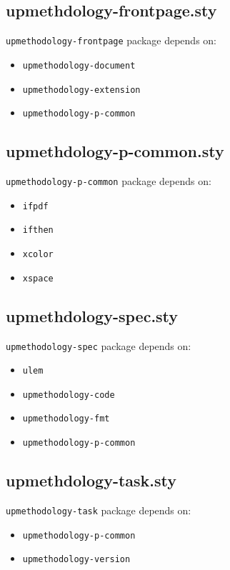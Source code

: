 \documentclass[book,taskpackage,specpackage,codepackage]{upmethodology-document}
\begin{document}
\subsection{upmethdology-frontpage.sty}

\texttt{upmethodology-frontpage} package depends on:
\begin{itemize}
\item \texttt{upmethodology-document}
\item \texttt{upmethodology-extension}
\item \texttt{upmethodology-p-common}
\end{itemize}

\subsection{upmethdology-p-common.sty}

\texttt{upmethodology-p-common} package depends on:
\begin{itemize}
\item \texttt{ifpdf}
\item \texttt{ifthen}
\item \texttt{xcolor}
\item \texttt{xspace}
\end{itemize}

\subsection{upmethdology-spec.sty}

\texttt{upmethodology-spec} package depends on:
\begin{itemize}
\item \texttt{ulem}
\item \texttt{upmethodology-code}
\item \texttt{upmethodology-fmt}
\item \texttt{upmethodology-p-common}
\end{itemize}

\subsection{upmethdology-task.sty}

\texttt{upmethodology-task} package depends on:
\begin{itemize}
\item \texttt{upmethodology-p-common}
\item \texttt{upmethodology-version}
\end{itemize}
\end{document}
